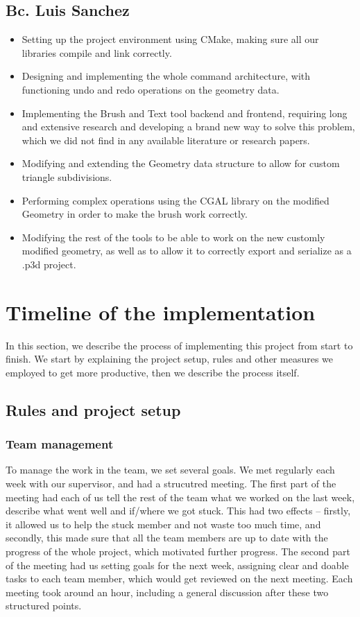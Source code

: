 \subsection{Bc. Luis Sanchez}
\begin{itemize}
\item Setting up the project environment using CMake, making sure all our libraries compile and link correctly.
\item Designing and implementing the whole command architecture, with functioning undo and redo operations on the geometry data.
\item Implementing the Brush and Text tool backend and frontend, requiring long and extensive research and developing a brand new way to solve this problem, which we did not find in any available literature or research papers.
\item Modifying and extending the Geometry data structure to allow for custom triangle subdivisions.
\item Performing complex operations using the CGAL library on the modified Geometry in order to make the brush work correctly.
\item Modifying the rest of the tools to be able to work on the new customly modified geometry, as well as to allow it to correctly export and serialize as a .p3d project.
\end{itemize}

\section{Timeline of the implementation}

In this section, we describe the process of implementing this project from start to finish. We start by explaining the project setup, rules and other measures we employed to get more productive, then we describe the process itself.

\subsection{Rules and project setup}

\subsubsection{Team management}
To manage the work in the team, we set several goals. We met regularly each week with our supervisor, and had a strucutred meeting. The first part of the meeting had each of us tell the rest of the team what we worked on the last week, describe what went well and if/where we got stuck. This had two effects -- firstly, it allowed us to help the stuck member and not waste too much time, and secondly, this made sure that all the team members are up to date with the progress of the whole project, which motivated further progress. The second part of the meeting had us setting goals for the next week, assigning clear and doable tasks to each team member, which would get reviewed on the next meeting. Each meeting took around an hour, including a general discussion after these two structured points.

